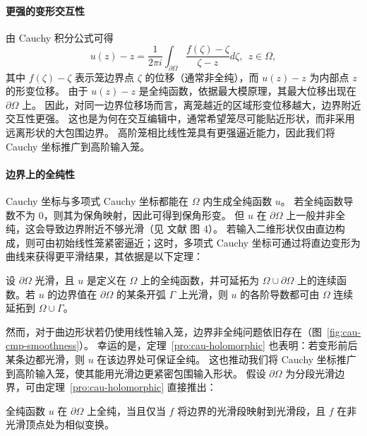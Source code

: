 \paragraph{更强的变形交互性}
由 Cauchy 积分公式可得
\begin{equation}
    u(z)-z=\frac{1}{2\pi i}\int_{\partial \Omega}\frac{f(\zeta)-\zeta}{\zeta-z} d\zeta,\ \ z \in \Omega,
\end{equation}
其中 \(f(\zeta)-\zeta\) 表示笼边界点 $\zeta$ 的位移（通常非全纯），而 \(u(z)-z\) 为内部点 \(z\) 的形变位移。
由于 \(u(z)-z\) 是全纯函数，依据最大模原理，其最大位移出现在 \(\partial \Omega\) 上。
因此，对同一边界位移场而言，离笼越近的区域形变位移越大，边界附近交互性更强。
这也是为何在交互编辑中，通常希望笼尽可能贴近形状，而非采用远离形状的大包围边界。
高阶笼相比线性笼具有更强逼近能力，因此我们将 Cauchy 坐标推广到高阶输入笼。

\paragraph{边界上的全纯性}
Cauchy 坐标与多项式 Cauchy 坐标都能在 \(\Omega\) 内生成全纯函数 $u$。
若全纯函数导数不为 0，则其为保角映射，因此可得到保角形变。
但 $u$ 在 \(\partial \Omega\) 上一般并非全纯，这会导致边界附近不够光滑（见 文献\cite{Lin2024PolynomialCC} 图 4）。
若输入二维形状仅由直边构成，则可由初始线性笼紧密逼近；这时，多项式 Cauchy 坐标可通过将直边变形为 \Bezier 曲线来获得更平滑结果，其依据是以下定理：
\begin{theorem}\label{pro:cau-holomorphic}
设 \(\partial \Omega\) 光滑，且 \(u\) 是定义在 \(\Omega\) 上的全纯函数，并可延拓为 \(\Omega\cup \partial \Omega\) 上的连续函数。若 \(u\) 的边界值在 \(\partial\Omega\) 的某条开弧 \(\Gamma\) 上光滑，则 \(u\) 的各阶导数都可由 \(\Omega\) 连续延拓到 \(\Omega \cup \Gamma\)。
\end{theorem}

然而，对于曲边形状若仍使用线性输入笼，边界非全纯问题依旧存在（图~\ref{fig:cau-cmp-smoothness}）。
幸运的是，定理~\ref{pro:cau-holomorphic} 也表明：若变形前后某条边都光滑，则 $u$ 在该边界处可保证全纯。
这也推动我们将 Cauchy 坐标推广到高阶输入笼，使其能用光滑边更紧密包围输入形状。
假设 \(\partial \Omega\) 为分段光滑边界，可由定理~\ref{pro:cau-holomorphic} 直接推出：
 \begin{lemma}\label{pro:cau-lemma_holo}
 全纯函数 \(u\) 在 \(\partial \Omega\) 上全纯，当且仅当 \(f\) 将边界的光滑段映射到光滑段，且 \(f\) 在非光滑顶点处为相似变换。
 \end{lemma}

